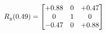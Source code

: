 \documentclass[preview]{standalone}
\begin{document}
\begin{align*}
\special{dvisvgm:raw <g id='unique000'>}R_{y}(0.49) = \begin{bmatrix}+0.88 & 0 & +0.47 \\0 & 1 & 0 \\-0.47 & 0 & +0.88\end{bmatrix}\special{dvisvgm:raw </g>}
\end{align*}
\end{document}
